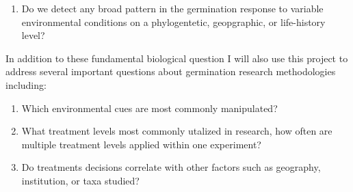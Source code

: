 \documentclass{article}\usepackage[]{graphicx}\usepackage[]{color}
\begin{document}
{{\begin{enumerate}
\item Do we detect any broad pattern in the germination response to variable environmental conditions on a phylogentetic, geopgraphic, or life-history level?
\end{enumerate}
\indent In addition to these fundamental biological question I will also use this project to address several important questions about germination research methodologies including:
\begin{enumerate}
\item Which environmental cues are most commonly manipulated?
\item What treatment levels most commonly utalized in research, how often are multiple treatment levels applied within one experiment?
\item Do treatments decisions correlate with other factors such as geography, institution, or taxa studied?
\end{enumerate}
}}
\end{document}
